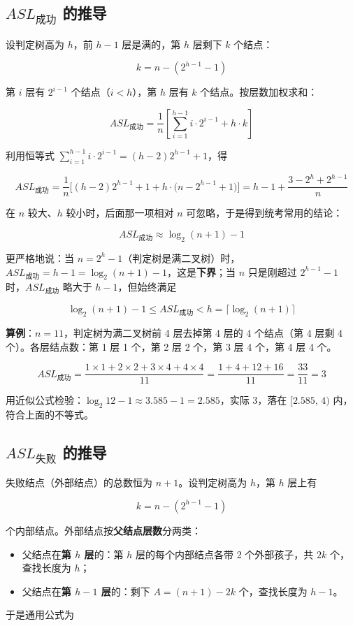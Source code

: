 \documentclass[11pt,openany,UTF8]{ctexbook}
\begin{document}
\subsection{$ASL_{成功}$ 的推导}

设判定树高为 $h$，前 $h-1$ 层是满的，第 $h$ 层剩下 $k$ 个结点：

\[k=n-(2^{h-1}-1)\]

第 $i$ 层有 $2^{i-1}$ 个结点（$i<h$），第 $h$ 层有 $k$ 个结点。按层数加权求和：

\[ASL_{成功}=\frac{1}{n}\left[\sum_{i=1}^{h-1} i\cdot 2^{i-1}+h\cdot k\right]\]

利用恒等式 $\sum_{i=1}^{h-1} i\cdot 2^{i-1}=(h-2)2^{h-1}+1$，得

\[ASL_{成功}=\frac{1}{n}\Big[(h-2)2^{h-1}+1+h\cdot\big(n-2^{h-1}+1\big)\Big]
= h-1+\frac{3-2^{h}+2^{h-1}}{n}\]

在 $n$ 较大、$h$ 较小时，后面那一项相对 $n$ 可忽略，于是得到统考常用的结论：

\[\boxed{ASL_{成功}\approx \log_2(n+1)-1}\]

更严格地说：当 $n=2^{h}-1$（判定树是满二叉树）时，$ASL_{成功}=h-1=\log_2(n+1)-1$，这是\textbf{下界}；当 $n$ 只是刚超过 $2^{h-1}-1$ 时，$ASL_{成功}$ 略大于 $h-1$，但始终满足

\[\log_2(n+1)-1\le ASL_{成功}<h=\lceil\log_2(n+1)\rceil\]

\textbf{算例}：$n=11$，判定树为满二叉树前 4 层去掉第 4 层的 4 个结点（第 4 层剩 4 个）。各层结点数：第 1 层 1 个，第 2 层 2 个，第 3 层 4 个，第 4 层 4 个。

\[ASL_{成功}=\frac{1\times1+2\times2+3\times4+4\times4}{11}=\frac{1+4+12+16}{11}=\frac{33}{11}=3\]

用近似公式检验：$\log_2 12-1\approx 3.585-1=2.585$，实际 3，落在 $[2.585,\,4)$ 内，符合上面的不等式。

\subsection{$ASL_{失败}$ 的推导}

失败结点（外部结点）的总数恒为 $n+1$。设判定树高为 $h$，第 $h$ 层上有

\[k=n-\left(2^{h-1}-1\right)\]

个内部结点。外部结点按\textbf{父结点层数}分两类：

\begin{itemize}
\item 父结点在\textbf{第 $h$ 层}的：第 $h$ 层的每个内部结点各带 2 个外部孩子，共 $2k$ 个，查找长度为 $h$；
\item 父结点在\textbf{第 $h-1$ 层}的：剩下 $A=(n+1)-2k$ 个，查找长度为 $h-1$。
\end{itemize}
于是通用公式为
\end{document}
